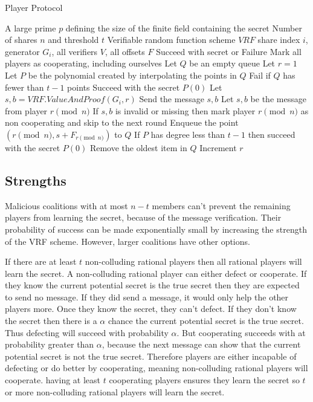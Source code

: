 \documentclass{dalcsthesis}
\begin{document}
\begin{algorithm}
  \caption{Player Protocol}
  \label{alg:ABI_Player}
  \begin{algorithmic}
    \INPUT A large prime $p$ defining the size of the finite field containing the secret
    \INPUT Number of shares $n$ and threshold $t$
    \INPUT Verifiable random function scheme $VRF$
    \INPUT share index $i$, generator $G_i$, all verifiers $V$, all offsets $F$
    \OUTPUT Succeed with secret or Failure
    \STATE Mark all players as cooperating, including ourselves
    \STATE Let $Q$ be an empty queue
    \STATE Let $r = 1$
      \STATE Let $P$ be the polynomial created by interpolating the points in $Q$
        \STATE Fail if $Q$ has fewer than $t-1$ points
        \STATE Succeed with the secret $P(0)$
      \ENDIF
      	\STATE Let $s, b = VRF.ValueAndProof(G_i, r)$
      	\STATE Send the message $s, b$
      \ELSE
        \STATE Let $s, b$ be the message from player $r \pmod{n}$
        \STATE If $s, b$ is invalid or missing then mark player $r \pmod{n}$ as non cooperating and skip to the next round
      \ENDIF
      \STATE Enqueue the point $(r \pmod{n}, s + F_{r \pmod{n}})$ to $Q$
        \STATE If $P$ has degree less than $t-1$ then succeed with the secret $P(0)$
        \STATE Remove the oldest item in $Q$
      \ENDIF
      \STATE Increment $r$
    \ENDWHILE
  \end{algorithmic}
\end{algorithm}

\subsection{Strengths}

Malicious coalitions with at most $n-t$ members can't prevent the remaining players from learning the secret, because of the message verification. Their probability of success can be made exponentially small by increasing the strength of the VRF scheme. However, larger coalitions have other options. 

If there are at least $t$ non-colluding rational players then all rational players will learn the secret. A non-colluding rational player can either defect or cooperate. If they know the current potential secret is the true secret then they are expected to send no message. If they did send a message, it would only help the other players more. Once they know the secret, they can't defect. If they don't know the secret then there is a $\alpha$ chance the current potential secret is the true secret. Thus defecting will succeed with probability $\alpha$. But cooperating succeeds with at probability greater than $\alpha$, because the next message can show that the current potential secret is not the true secret. Therefore players are either incapable of defecting or do better by cooperating, meaning non-colluding rational players will cooperate. having at least $t$ cooperating players ensures they learn the secret so $t$ or more non-colluding rational players will learn the secret.
\end{document}
